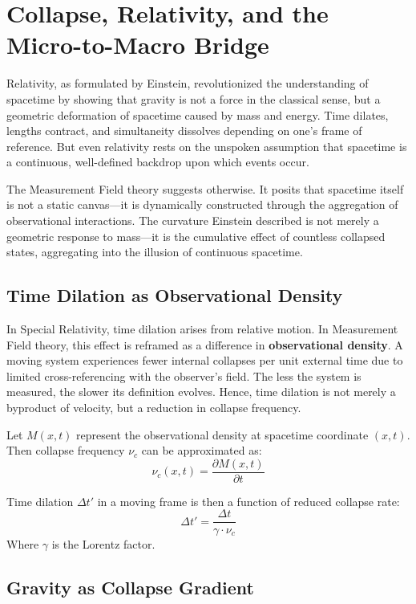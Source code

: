 \chapter{Collapse, Relativity, and the Micro-to-Macro Bridge}
\renewcommand{\thesection}{12.\arabic{section}}

Relativity, as formulated by Einstein, revolutionized the understanding of spacetime by showing that gravity is not a force in the classical sense, but a geometric deformation of spacetime caused by mass and energy. Time dilates, lengths contract, and simultaneity dissolves depending on one’s frame of reference. But even relativity rests on the unspoken assumption that spacetime is a continuous, well-defined backdrop upon which events occur.

The Measurement Field theory suggests otherwise. It posits that spacetime itself is not a static canvas—it is dynamically constructed through the aggregation of observational interactions. The curvature Einstein described is not merely a geometric response to mass—it is the cumulative effect of countless collapsed states, aggregating into the illusion of continuous spacetime.

\section{Time Dilation as Observational Density}

In Special Relativity, time dilation arises from relative motion. In Measurement Field theory, this effect is reframed as a difference in \textbf{observational density}. A moving system experiences fewer internal collapses per unit external time due to limited cross-referencing with the observer’s field. The less the system is measured, the slower its definition evolves. Hence, time dilation is not merely a byproduct of velocity, but a reduction in collapse frequency.

Let $M(x,t)$ represent the observational density at spacetime coordinate $(x,t)$. Then collapse frequency $\nu_c$ can be approximated as:
\[
\nu_c(x,t) = \frac{\partial M(x,t)}{\partial t}
\]

Time dilation $\Delta t'$ in a moving frame is then a function of reduced collapse rate:
\[
\Delta t' = \frac{\Delta t}{\gamma \cdot \nu_c}
\]
Where $\gamma$ is the Lorentz factor.

\section{Gravity as Collapse Gradient}

